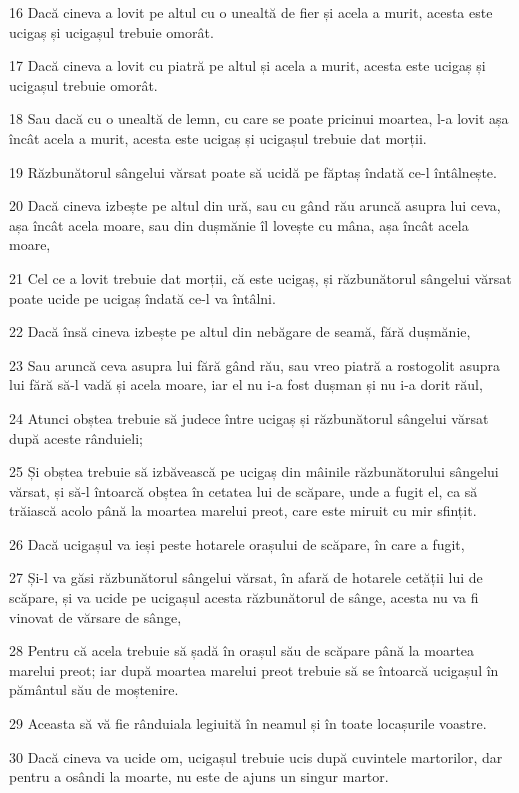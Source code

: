 \par 16 Dacă cineva a lovit pe altul cu o unealtă de fier și acela a murit, acesta este ucigaș și ucigașul trebuie omorât.
\par 17 Dacă cineva a lovit cu piatră pe altul și acela a murit, acesta este ucigaș și ucigașul trebuie omorât.
\par 18 Sau dacă cu o unealtă de lemn, cu care se poate pricinui moartea, l-a lovit așa încât acela a murit, acesta este ucigaș și ucigașul trebuie dat morții.
\par 19 Răzbunătorul sângelui vărsat poate să ucidă pe făptaș îndată ce-l întâlnește.
\par 20 Dacă cineva izbește pe altul din ură, sau cu gând rău aruncă asupra lui ceva, așa încât acela moare, sau din dușmănie îl lovește cu mâna, așa încât acela moare,
\par 21 Cel ce a lovit trebuie dat morții, că este ucigaș, și răzbunătorul sângelui vărsat poate ucide pe ucigaș îndată ce-l va întâlni.
\par 22 Dacă însă cineva izbește pe altul din nebăgare de seamă, fără dușmănie,
\par 23 Sau aruncă ceva asupra lui fără gând rău, sau vreo piatră a rostogolit asupra lui fără să-l vadă și acela moare, iar el nu i-a fost dușman și nu i-a dorit răul,
\par 24 Atunci obștea trebuie să judece între ucigaș și răzbunătorul sângelui vărsat după aceste rânduieli;
\par 25 Și obștea trebuie să izbăvească pe ucigaș din mâinile răzbunătorului sângelui vărsat, și să-l întoarcă obștea în cetatea lui de scăpare, unde a fugit el, ca să trăiască acolo până la moartea marelui preot, care este miruit cu mir sfințit.
\par 26 Dacă ucigașul va ieși peste hotarele orașului de scăpare, în care a fugit,
\par 27 Și-l va găsi răzbunătorul sângelui vărsat, în afară de hotarele cetății lui de scăpare, și va ucide pe ucigașul acesta răzbunătorul de sânge, acesta nu va fi vinovat de vărsare de sânge,
\par 28 Pentru că acela trebuie să șadă în orașul său de scăpare până la moartea marelui preot; iar după moartea marelui preot trebuie să se întoarcă ucigașul în pământul său de moștenire.
\par 29 Aceasta să vă fie rânduiala legiuită în neamul și în toate locașurile voastre.
\par 30 Dacă cineva va ucide om, ucigașul trebuie ucis după cuvintele martorilor, dar pentru a osândi la moarte, nu este de ajuns un singur martor.
